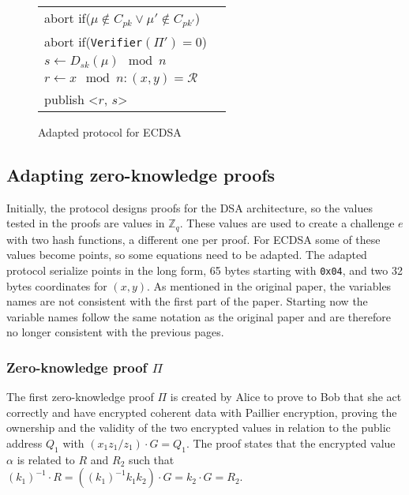 \begin{figure}[H]
\begin{table}[H]
\begin{footnotesize}
{\begin{tabular}{ | l l | }
        abort if($\mu \notin C_{pk} \lor \mu' \notin C_{pk'}$) & \\
        abort if(\texttt{Verifier}$(\Pi') = 0$) & \\
        $s \leftarrow D_{sk}(\mu) \mod n$ & \\
        $r \leftarrow x \mod n : (x,y) = \mathcal{R}$ & \\
        publish <$r$, $s$> & \\
        \hline
      \end{tabular}}
      \end{footnotesize}
    \end{table}

  \caption{Adapted protocol for ECDSA}
  \label{fig:adaptationSchemeECDSA}
\end{figure}

\subsection{Adapting zero-knowledge proofs}

Initially, the protocol designs proofs for the DSA architecture, so the values
tested in the proofs are values in $\mathbb{Z}_{q}$. These values are used to
create a challenge $e$ with two hash functions, a different one per proof. For
ECDSA some of these values become points, so some equations need to be adapted.
The adapted protocol serialize points in the long form, 65 bytes starting with
\texttt{0x04}, and two 32 bytes coordinates for $(x, y)$. As mentioned in the
original paper, the variables names are not consistent with the first part of
the paper. Starting now the variable names follow the same notation as the
original paper and are therefore no longer consistent with the previous pages.

\subsubsection{Zero-knowledge proof $\Pi$}

The first zero-knowledge proof $\Pi$ is created by Alice to prove to Bob that
she act correctly and have encrypted coherent data with Paillier encryption,
proving the ownership and the validity of the two encrypted values in relation
to the public address $Q_1$ with $(x_1z_1 / z_1) \cdot G = Q_1$. The proof
states that the encrypted value $\alpha$ is related to $R$ and $R_2$ such that
$(k_1)^{-1} \cdot R = ((k_1)^{-1}k_1k_2) \cdot G = k_2 \cdot G = R_2$.

